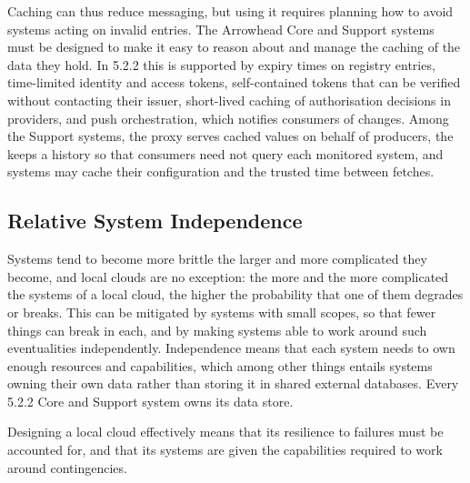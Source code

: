 \documentclass[a4paper]{arrowhead}
\newcommand{\sys}[1]{\textcolor{ArrowheadBlue}{\textbf{\ahbreak{#1}}}}      %
\begin{document}
Caching can thus reduce messaging, but using it requires planning how to avoid systems acting on
invalid entries. The Arrowhead Core and Support systems must be designed to make it easy to reason
about and manage the caching of the data they hold. In 5.2.2 this is supported by expiry times on
registry entries, time-limited identity and access tokens, self-contained tokens that can be
verified without contacting their issuer, short-lived caching of authorisation decisions in
providers, and push orchestration, which notifies consumers of changes. Among the Support systems,
the \sys{DataManager} proxy serves cached values on behalf of producers, the \sys{SysMonitor} keeps a
history so that consumers need not query each monitored system, and systems may cache their
configuration and the trusted time between fetches.

\subsection{Relative System Independence}
Systems tend to become more brittle the larger and more complicated they become, and local
clouds are no exception: the more and the more complicated the systems of a local cloud, the
higher the probability that one of them degrades or breaks. This can be mitigated by systems with
small scopes, so that fewer things can break in each, and by making systems able to work around
such eventualities independently. Independence means that each system needs to own enough
resources and capabilities, which among other things entails systems owning their own data
rather than storing it in shared external databases. Every 5.2.2 Core and Support system owns
its data store.

Designing a local cloud effectively means that its resilience to failures must be accounted for,
and that its systems are given the capabilities required to work around contingencies.
\end{document}
